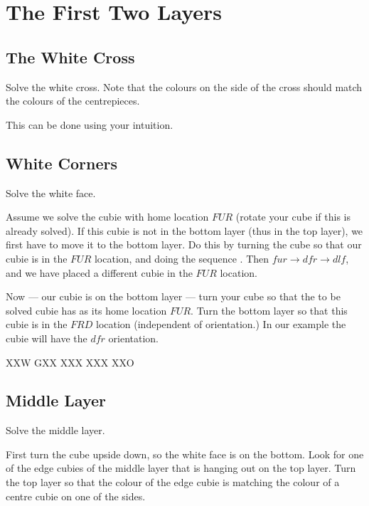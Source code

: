 \section{The First Two Layers}

\subsection{The White Cross}

\begin{goal}
    Solve the white cross.
    Note that the colours on the side of the cross should match the colours of the centrepieces.
\end{goal}
This can be done using your intuition.

\subsection{White Corners}

\begin{goal}
    Solve the white face.
\end{goal}

Assume we solve the cubie with home location $FUR$ (rotate your cube if this is already solved).
If this cubie is not in the bottom layer (thus in the top layer), we first have to move it to the bottom layer.
Do this by turning the cube so that our cubie is in the $FUR$ location, and doing the sequence .
Then $fur \to dfr \to dlf$, and we have placed a different cubie in the $FUR$ location.

Now --- our cubie is on the bottom layer --- turn your cube so that the to be solved cubie has as its home location $FUR$.
Turn the bottom layer so that this cubie is in the $FRD$ location (independent of orientation.)
In our example the cubie will have the $dfr$ orientation.


\RubikSliceBottomR XXW GXX
\RubikFaceDown XXX XXX XXO



\subsection{Middle Layer}

\begin{goal}
    Solve the middle layer.
\end{goal}

First turn the cube upside down, so the white face is on the bottom.
Look for one of the edge cubies of the middle layer that is hanging out on the top layer.
Turn the top layer so that the colour of the edge cubie is matching the colour of a centre cubie on one of the sides.

